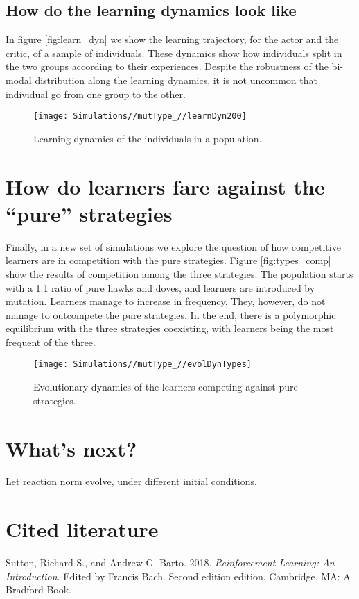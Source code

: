 \documentclass[]{article}
\begin{document}
\subsection{How do the learning dynamics look
like}\label{how-do-the-learning-dynamics-look-like}

In figure \ref{fig:learn_dyn} we show the learning trajectory, for the
actor and the critic, of a sample of individuals. These dynamics show
how individuals split in the two groups according to their experiences.
Despite the robustness of the bi-modal distribution along the learning
dynamics, it is not uncommon that individual go from one group to the
other.

\begin{figure}
\texttt{[image: Simulations//mutType\_//learnDyn200]} \caption{\label{fig:learn_dyn}Learning dynamics of the individuals in a population.}\label{fig:fig7}
\end{figure}

\section{\texorpdfstring{How do learners fare against the ``pure''
strategies}{How do learners fare against the pure strategies}}\label{how-do-learners-fare-against-the-pure-strategies}

Finally, in a new set of simulations we explore the question of how
competitive learners are in competition with the pure strategies. Figure
\ref{fig:types_comp} show the results of competition among the three
strategies. The population starts with a 1:1 ratio of pure hawks and
doves, and learners are introduced by mutation. Learners manage to
increase in frequency. They, however, do not manage to outcompete the
pure strategies. In the end, there is a polymorphic equilibrium with the
three strategies coexisting, with learners being the most frequent of
the three.

\begin{figure}
\texttt{[image: Simulations//mutType\_//evolDynTypes]} \caption{\label{fig:types_comp}Evolutionary dynamics of the learners competing against pure strategies.}\label{fig:fig8}
\end{figure}

\section{What's next?}\label{whats-next}

Let reaction norm evolve, under different initial conditions.

\section*{Cited literature}\label{cited-literature}

\hypertarget{refs}{}
\hypertarget{ref-sutton_reinforcement_2018}{}
Sutton, Richard S., and Andrew G. Barto. 2018. \emph{Reinforcement
Learning: An Introduction}. Edited by Francis Bach. Second edition
edition. Cambridge, MA: A Bradford Book.
\end{document}
